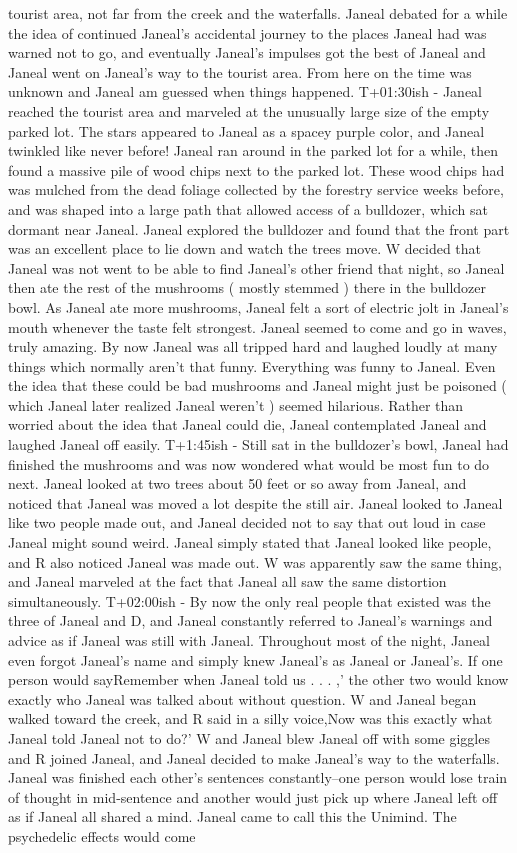\documentclass[12pt]{book}
\begin{document}
tourist area, not far from the creek and the waterfalls. Janeal debated for a while the idea of continued Janeal's accidental journey to the places Janeal had was warned not to go, and eventually Janeal's impulses got the best of Janeal and Janeal went on Janeal's way to the tourist area. From here on the time was unknown and Janeal am guessed when things happened. T+01:30ish - Janeal reached the tourist area and marveled at the unusually large size of the empty parked lot. The stars appeared to Janeal as a spacey purple color, and Janeal twinkled like never before! Janeal ran around in the parked lot for a while, then found a massive pile of wood chips next to the parked lot. These wood chips had was mulched from the dead foliage collected by the forestry service weeks before, and was shaped into a large path that allowed access of a bulldozer, which sat dormant near Janeal. Janeal explored the bulldozer and found that the front part was an excellent place to lie down and watch the trees move. W decided that Janeal was not went to be able to find Janeal's other friend that night, so Janeal then ate the rest of the mushrooms ( mostly stemmed ) there in the bulldozer bowl. As Janeal ate more mushrooms, Janeal felt a sort of electric jolt in Janeal's mouth whenever the taste felt strongest. Janeal seemed to come and go in waves, truly amazing. By now Janeal was all tripped hard and laughed loudly at many things which normally aren't that funny. Everything was funny to Janeal. Even the idea that these could be bad mushrooms and Janeal might just be poisoned ( which Janeal later realized Janeal weren't ) seemed hilarious. Rather than worried about the idea that Janeal could die, Janeal contemplated Janeal and laughed Janeal off easily. T+1:45ish - Still sat in the bulldozer's bowl, Janeal had finished the mushrooms and was now wondered what would be most fun to do next. Janeal looked at two trees about 50 feet or so away from Janeal, and noticed that Janeal was moved a lot despite the still air. Janeal looked to Janeal like two people made out, and Janeal decided not to say that out loud in case Janeal might sound weird. Janeal simply stated that Janeal looked like people, and R also noticed Janeal was made out. W was apparently saw the same thing, and Janeal marveled at the fact that Janeal all saw the same distortion simultaneously. T+02:00ish - By now the only real people that existed was the three of Janeal and D, and Janeal constantly referred to Janeal's warnings and advice as if Janeal was still with Janeal. Throughout most of the night, Janeal even forgot Janeal's name and simply knew Janeal's as Janeal or Janeal's. If one person would sayRemember when Janeal told us . . .  ,' the other two would know exactly who Janeal was talked about without question. W and Janeal began walked toward the creek, and R said in a silly voice,Now was this exactly what Janeal told Janeal not to do?' W and Janeal blew Janeal off with some giggles and R joined Janeal, and Janeal decided to make Janeal's way to the waterfalls. Janeal was finished each other's sentences constantly--one person would lose train of thought in mid-sentence and another would just pick up where Janeal left off as if Janeal all shared a mind. Janeal came to call this the Unimind. The psychedelic effects would come 
\end{document}
